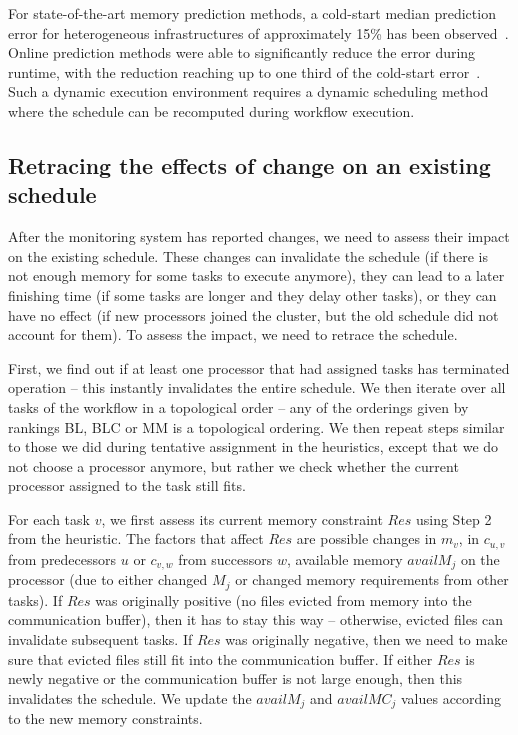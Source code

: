 \documentclass[conference]{IEEEtran}
\begin{document}
For state-of-the-art memory prediction methods, a cold-start median prediction error for heterogeneous infrastructures
of approximately 15\% has been observed~\cite{malik2013execution}.
Online prediction methods were able to significantly reduce the error during runtime, with the reduction reaching up to one third of the cold-start error~\cite{baderDiedrichDynamic2023,witt2019learning}.
Such a dynamic execution environment requires a dynamic scheduling method where the schedule can be recomputed during workflow execution.


\subsection*{Retracing the effects of change on an existing schedule}
After the monitoring system has reported changes, we need to assess their impact on the existing schedule.
These changes can invalidate the schedule (\eg if there is not enough memory for some tasks to execute anymore),
they can lead to a later finishing time (\eg if some tasks are longer and they delay other tasks), or they can have no effect (\eg if new processors
joined the cluster, but the old schedule did not account for them).
To assess the impact, we need to retrace the schedule.

First, we find out if at least one processor that had assigned tasks has terminated operation -- this instantly invalidates the
entire schedule.
%
We then iterate over all tasks of the workflow in a topological order -- 
any of the orderings given by rankings BL, BLC or MM is a topological ordering.
We then repeat steps similar to those we did during tentative assignment in the heuristics, 
except that we do not choose a processor
anymore, but rather we check whether the current processor assigned to the task still fits.

For each task $v$, we first assess its current memory constraint $Res$ using Step 2 from the heuristic.
The factors that affect $Res$ are possible changes in $m_v$, in $c_{u,v}$ from predecessors $u$ 
or $c_{v,w}$ from successors $w$,
available memory $availM_j$ on the processor (due to either changed $M_j$ or changed memory requirements 
from other tasks).
If $Res$ was originally positive (no files evicted from memory into the communication buffer), 
then it has to stay this way -- otherwise, evicted files can invalidate subsequent tasks.
If $Res$ was originally negative, then we need to make sure that evicted files still fit into the communication buffer.
If either $Res$ is newly negative or the communication buffer is not large enough,
then this invalidates the schedule.
We update the $availM_j$ and $availMC_j$ values according to the new memory constraints.
\end{document}
